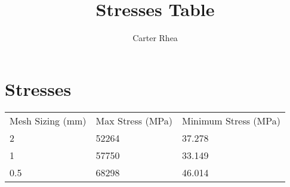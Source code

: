 \documentclass[11pt]{amsart}
\title{Stresses Table}
\author{Carter Rhea}
\begin{document}
\maketitle
\section{Stresses}
\begin{table}[!h]
\centering
\begin{tabular}{lll}
Mesh Sizing (mm) & Max Stress (MPa) & Minimum Stress (MPa) \\
2                & 52264            & 37.278               \\
1                & 57750            & 33.149               \\
0.5              & 68298            & 46.014              
\end{tabular}
\end{table}
\end{document}
